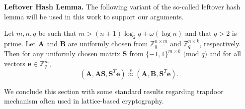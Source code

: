 \documentclass[runningheads,10pt]{llncs}
\begin{document}
\noindent\textbf{Leftover Hash Lemma.} 
The following variant of the so-called leftover hash  lemma will be used in this work to support our arguments.
\begin{lemma} \label{lhl}
	Let $m,n,q$ be such that $m>(n+1)\log_2 q+ \omega(\log n)$ and that $q> 2$ is prime. 
	Let $\mathbf{ A}$ and $\mathbf{B }$ are uniformly chosen from   
	$\mathbb{Z}_q^{n \times m}$ and  $\mathbb{Z}_q^{n \times k}$, respectively. 
	Then for any uniformly chosen matrix $\mathbf{S}$ from $\{-1, 1\}^{m \times k} \text{ (mod } q)$
	and for all vectors $\mathbf{e}\in \mathbb{Z}_q^{m}$, 
	$$(\mathbf{A}, \mathbf{A}\mathbf{S}, \mathbf{S}^T\mathbf{e}) \stackrel{\text{s}}{\approx} (\mathbf{A}, \mathbf{B}, \mathbf{S}^T\mathbf{e}).$$
\end{lemma}


We conclude this section with some standard results regarding trapdoor 
mechanism often used in lattice-based cryptography. \\
\end{document}
